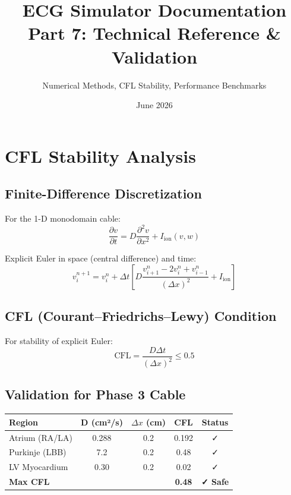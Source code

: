 \documentclass[11pt, a4paper]{article}
\title{ECG Simulator Documentation\\Part 7: Technical Reference \& Validation}
\author{Numerical Methods, CFL Stability, Performance Benchmarks}
\date{June 2026}
\begin{document}
\maketitle
\tableofcontents
\newpage

\section{CFL Stability Analysis}

\subsection{Finite-Difference Discretization}

For the 1-D monodomain cable:
\begin{equation}
    \frac{\partial v}{\partial t} = D \frac{\partial^2 v}{\partial x^2} + I_{\text{ion}}(v, w)
\end{equation}

Explicit Euler in space (central difference) and time:
\begin{equation}
    v_i^{n+1} = v_i^n + \Delta t \left[ D \frac{v_{i+1}^n - 2v_i^n + v_{i-1}^n}{(\Delta x)^2} + I_{\text{ion}} \right]
\end{equation}

\subsection{CFL (Courant--Friedrichs--Lewy) Condition}

For stability of explicit Euler:
\begin{equation}
    \text{CFL} = \frac{D \Delta t}{(\Delta x)^2} \leq 0.5
\end{equation}

\subsection{Validation for Phase 3 Cable}

\begin{tabularx}{\textwidth}{|l|c|c|c|c|}
\hline
\textbf{Region} & D (cm²/s) & $\Delta x$ (cm) & CFL & Status \\
\hline
Atrium (RA/LA) & 0.288 & 0.2 & 0.192 & ✓ \\
Purkinje (LBB) & 7.2 & 0.2 & 0.48 & ✓ \\
LV Myocardium & 0.30 & 0.2 & 0.02 & ✓ \\
\hline
\textbf{Max CFL} & & & \textbf{0.48} & \textbf{✓ Safe} \\
\hline
\end{tabularx}
\end{document}
